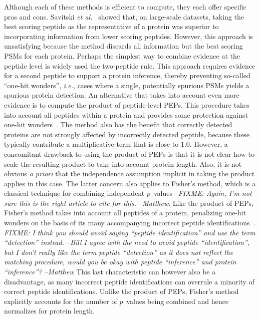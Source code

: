\documentclass{article}
\begin{document}
Although each of these methods is efficient to compute, they each
offer specific pros and cons.  Savitski {\em et
  al.}~\cite{savitski2015scalable} showed that, on large-scale
datasets, taking the best scoring peptide as the representative of a
protein was superior to incorporating information from lower scoring
peptides. However, this approach is unsatisfying because the method
discards all information but the best scoring PSMs for each protein.
Perhaps the simplest way to combine evidence at the peptide level is
widely used the two-peptide rule.  This approach requires evidence for
a second peptide to support a protein inference, thereby preventing
so-called ``one-hit wonders'', {\em i.e.}, cases where a single,
potentially spurious PSMs yields a spurious protein detection.  An
alternative that takes into account even more evidence is to compute
the product of peptide-level PEPs. This procedure takes into account
all peptides within a protein and provides some protection against
one-hit wonders~\cite{cox2008maxquant}. The method also has the
benefit that correctly detected proteins are not strongly affected by
incorrectly detected peptide, because these typically contribute a
multiplicative term that is close to $1.0$. However, a concomitant
drawback to using the product of PEPs is that it is not clear how to
scale the resulting product to take into account protein length.
Also, it is not obvious {\em a priori} that the independence
assumption implicit in taking the product applies in this case.  The
latter concern also applies to Fisher's method, which is a classical
technique for combining independent
$p$~values~\cite{fisher1925statistical} {\em FIXME: Again, I'm not
  sure this is the right article to cite for this. --Matthew}. Like
the product of PEPs, Fisher's method takes into account all peptides
of a protein, penalizing one-hit wonders on the basis of its many
accompanying incorrect peptide
identifications~\cite{spirin2011assigning, alves2015mass,
  granholm2013determining}. {\em FIXME: I think you should avoid
  saying ``peptide identification'' and use the term ``detection''
  instead. --Bill I agree with the need to avoid peptide
  ``identification'', but I don't really like the term peptide
  ``detection'' as it does not reflect the matching procedure, would
  you be okay with peptide ``inference'' and protein ``inference''?
  --Matthew} This last characteristic can however also be a
disadvantage, as many incorrect peptide identifications can overrule a
minority of correct peptide identifications.  Unlike the product of
PEPs, Fisher's method explicitly accounts for the number of $p$~values
being combined and hence normalizes for protein length.
\end{document}
